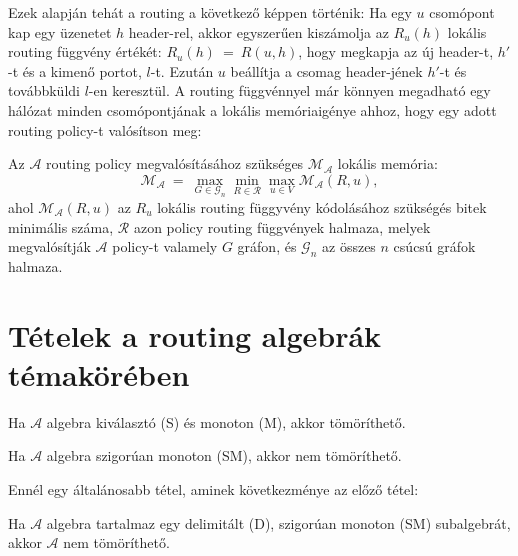   Ezek alapján tehát a routing a következő képpen történik: Ha egy $u$ csomópont kap egy üzenetet $h$ header-rel, akkor egyszerűen kiszámolja az $R_{u}(h)$ lokális routing függvény értékét: $R_{u}(h)~=~R(u,h)$, hogy megkapja az új header-t, $h'$-t és a kimenő portot, $l$-t. Ezután $u$ beállítja a csomag header-jének $h'$-t és továbbküldi $l$-en keresztül.
  A routing függvénnyel már könnyen megadható egy hálózat minden csomópontjának a lokális memóriaigénye ahhoz, hogy egy adott routing policy-t valósítson meg:
  \begin{definition} 
    Az $\mathcal{A}$ routing policy megvalósításához szükséges $\mathcal{M_{\mathcal{A}}}$ lokális memória: $$\mathcal{M_{\mathcal{A}}}~=~\max_{G \in \mathcal{G}_{n}}{ \min_{R \in \mathcal{R}}{\max_{u \in V}{ \mathcal{M_{\mathcal{A}}}(R,u)}}},$$ ahol $\mathcal{M_{\mathcal{A}}}(R,u)$ az $R_{u}$ lokális routing függyvény kódolásához szükségés bitek minimális száma, $\mathcal{R}$ azon policy routing függvények halmaza, melyek megvalósítják $\mathcal{A}$ policy-t valamely $G$ gráfon, és $\mathcal{G}_{n}$ az összes $n$ csúcsú gráfok halmaza.
  \end{definition}
  
  \section{Tételek a routing algebrák témakörében}\label{sect:appendix_algebratetelek}
  \begin{theorem}\label{eq:appendix_algebratetel1}
    Ha $\mathcal{A}$ algebra kiválasztó (S) és monoton (M), akkor tömöríthető.
  \end{theorem}

  \begin{theorem}\label{eq:appendix_algebratetel2}
    Ha $\mathcal{A}$ algebra szigorúan monoton (SM), akkor nem tömöríthető.
  \end{theorem}

  Ennél egy általánosabb tétel, aminek következménye az előző tétel:
  \begin{theorem}\label{eq:appendix_algebratetel3}
    Ha $\mathcal{A}$ algebra tartalmaz egy delimitált (D), szigorúan monoton (SM) subalgebrát, akkor $\mathcal{A}$ nem tömöríthető.
  \end{theorem}
  \newpage
  
